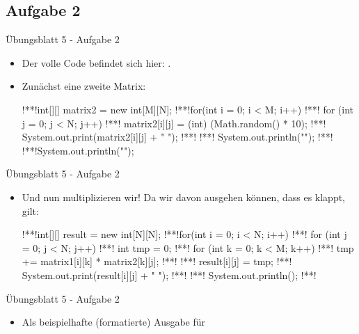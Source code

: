 \subsection{Aufgabe 2}
\begin{frame}[t,fragile]{Übungsblatt 5 - Aufgabe 2}
    \begin{itemize}[<+(1)->]
        \item Der volle Code befindet sich hier: .
        \item Zunächst eine zweite Matrix:
\begin{plainjava}
!**!int[][] matrix2 = new int[M][N];
!**!for(int i = 0; i < M; i++) {
!**!    for (int j = 0; j < N; j++) {
!**!        matrix2[i][j] = (int) (Math.random() * 10);
!**!        System.out.print(matrix2[i][j] + " ");
!**!    }
!**!    System.out.println("");
!**!}
!**!System.out.println("");
\end{plainjava}
    \end{itemize}
\end{frame}

\begin{frame}[t,fragile]{Übungsblatt 5 - Aufgabe 2}
    \begin{itemize}[<+(1)->]
        \item Und nun multiplizieren wir! Da wir davon ausgehen können, dass es klappt, gilt:
\begin{plainjava}
!**!int[][] result = new int[N][N];
!**!for(int i = 0; i < N; i++) {
!**!    for (int j = 0; j < N; j++) {
!**!        int tmp = 0;
!**!        for (int k = 0; k < M; k++) {
!**!            tmp += matrix1[i][k] * matrix2[k][j];
!**!        }
!**!        result[i][j] = tmp;
!**!        System.out.print(result[i][j] + " ");
!**!    }
!**!    System.out.println();
!**!}
\end{plainjava}
    \end{itemize}
\end{frame}

\iffull
{}
\begin{frame}[t,fragile]{Übungsblatt 5 - Aufgabe 2}
    \def\rbashcurrentinject{multicols=2}%
    \begin{itemize}[<+(1)->]
        \item {}Als beispielhafte (formatierte) Ausgabe für 
    \end{itemize}
\end{frame}
\fi

